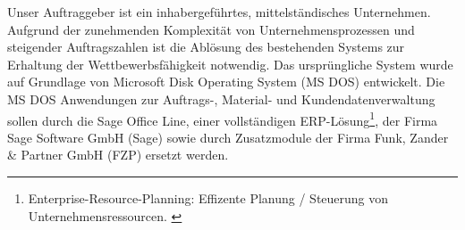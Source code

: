 Unser Auftraggeber ist ein inhabergeführtes, mittelständisches Unternehmen. Aufgrund der zunehmenden Komplexität von Unternehmensprozessen und steigender Auftragszahlen ist die Ablösung des bestehenden Systems zur Erhaltung der Wettbewerbsfähigkeit notwendig. Das ursprüngliche System wurde auf Grundlage von Microsoft Disk Operating System (MS DOS) entwickelt. Die MS DOS Anwendungen zur Auftrags-, Material- und Kundendatenverwaltung sollen durch die Sage Office Line, einer vollständigen ERP-Lösung\footnote{\label{foot:1}Enterprise-Resource-Planning: Effizente Planung / Steuerung von Unternehmensressourcen. \cite{ERP}}, der Firma Sage Software GmbH (Sage) sowie durch Zusatzmodule der Firma Funk, Zander \& Partner GmbH (FZP) ersetzt werden. \cite{einleitung1}